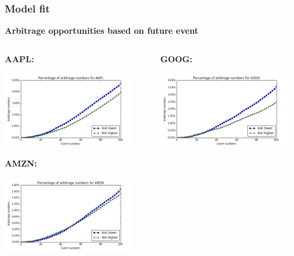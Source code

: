 \documentclass[xcolor={x11names,svgnames,dvipsnames}]{beamer}
\begin{document}
\begin{frame}
\frametitle{Model fit}
\textbf{Arbitrage opportunities based on future event}
\begin{columns}		
		\begin{column}{.5\textwidth}
		   \textbf{AAPL:}

						\includegraphics[width=0.9\textwidth, height=0.35\textheight]{AAPL_arbitrage_event.png}

			 \textbf{AMZN:}

									\includegraphics[width=0.9\textwidth, height=0.35\textheight]{AMZN_arbitrage_event.png}

		\end{column}
		\begin{column}{.5\textwidth}
			 \textbf{GOOG:}

									\includegraphics[width=0.9\textwidth, height=0.35\textheight]{GOOG_arbitrage_event.png}


\end{column}
\end{columns}
\end{frame}
\end{document}
